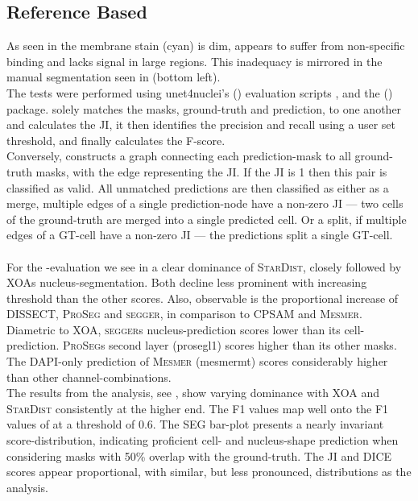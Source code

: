 \subsection*{Reference Based}
As seen in  the membrane stain (cyan) is dim, appears to suffer from non-specific binding and lacks signal in large regions. This inadequacy is mirrored in the manual segmentation seen in  (bottom left).\\
The tests were performed using unet4nuclei's () evaluation scripts \cite{noauthor_carpenterlab2019_caicedo_cytometrya_2025}, and the  () package\cite{noauthor_deepcell-toolbox_2023}.  solely matches the masks, ground-truth and prediction, to one another and calculates the JI, it then identifies the precision and recall using a user set threshold, and finally calculates the F-score.\\
Conversely,  constructs a graph connecting each prediction-mask to all ground-truth masks, with the edge representing the JI. If the JI is 1 then this pair is classified as valid. All unmatched predictions are then classified as either as a merge, multiple edges of a single prediction-node have a non-zero JI --- two cells of the ground-truth are merged into a single predicted cell. Or a split, if multiple edges of a GT-cell have a non-zero JI --- the predictions split a single GT-cell.\\
\\
For the -evaluation we see in  a clear dominance of \textsc{StarDist}, closely followed by \textsc{XOA}s nucleus-segmentation. Both decline less prominent with increasing threshold than the other scores. Also, observable is the proportional increase of \textsc{DISSECT}, \textsc{ProSeg} and \textsc{segger}, in comparison to \textsc{CPSAM} and \textsc{Mesmer}. Diametric to \textsc{XOA}, \textsc{segger}s nucleus-prediction scores lower than its cell-prediction. \textsc{ProSeg}s second layer (proseg\us l1) scores higher than its other masks. The DAPI-only prediction of \textsc{Mesmer} (mesmer\us mt) scores considerably higher than other channel-combinations.\\%
The results from the  analysis, see , show varying dominance with \textsc{XOA} and \textsc{StarDist} consistently at the higher end. The F1 values map well onto the F1 values of  at a threshold of 0.6. The SEG bar-plot presents a nearly invariant score-distribution, indicating proficient cell- and nucleus-shape prediction when considering masks with 50\% overlap with the ground-truth. The JI and DICE scores appear proportional, with similar, but less pronounced, distributions as the  analysis.\\%
